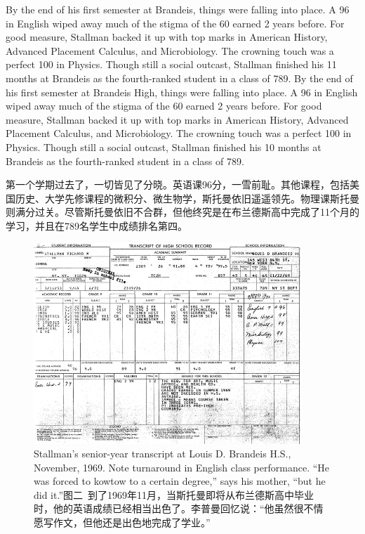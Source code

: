 \ifdefined\eng
\ifdefined\vone
By the end of his first semester at Brandeis, things were falling into place. A 96 in English wiped away much of the stigma of the 60 earned 2 years before. For good measure, Stallman backed it up with top marks in American History, Advanced Placement Calculus, and Microbiology. The crowning touch was a perfect 100 in Physics. Though still a social outcast, Stallman finished his 11 months at Brandeis as the fourth-ranked student in a class of 789.
\fi
\ifdefined\vtwo
By the end of his first semester at Brandeis High, things were falling into place. A 96 in English wiped away much of the stigma of the 60 earned 2 years before. For good measure, Stallman backed it up with top marks in American History, Advanced Placement Calculus, and Microbiology. The crowning touch was a perfect 100 in Physics. Though still a social outcast, Stallman finished his 10 months at Brandeis as the fourth-ranked student in a class of 789.
\fi
\fi

\ifdefined\chs
第一个学期过去了，一切皆见了分晓。英语课96分，一雪前耻。其他课程，包括美国历史、大学先修课程的微积分、微生物学，斯托曼依旧遥遥领先。物理课斯托曼则满分过关。尽管斯托曼依旧不合群，但他终究是在布兰德斯高中完成了11个月的学习，并且在789名学生中成绩排名第四。
\fi

\ifdefined\vone
\begin{figure}[ht] \centering
  \includegraphics[width=\textwidth]{transcript}
  \caption{\ifdefined\eng Stallman's senior-year transcript at Louis D. Brandeis H.S., November, 1969. Note turnaround in English class performance. ``He was forced to kowtow to a certain degree,'' says his mother, ``but he did it.''\fi\ifdefined\chs 图二\ 到了1969年11月，当斯托曼即将从布兰德斯高中毕业时，他的英语成绩已经相当出色了。李普曼回忆说：``他虽然很不情愿写作文，但他还是出色地完成了学业。''\fi}
\end{figure}
\fi

